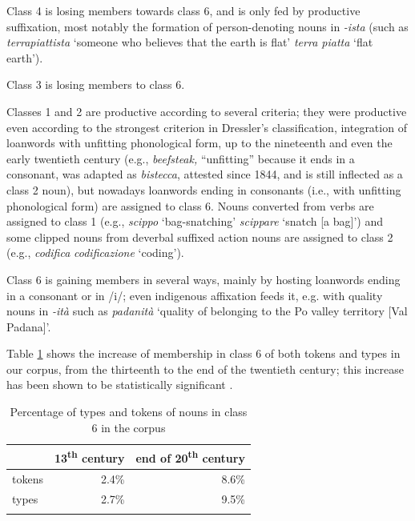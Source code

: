 \documentclass[output=paper,colorlinks,citecolor=brown]{langscibook}
\begin{document}
Class 4 is losing members towards class 6, and is only fed by productive suffixation, most notably the formation of person-denoting nouns in \emph{-ista} (such as \emph{terrapiattista} `someone who believes that the earth is flat' \leftarrow \emph{terra piatta} `flat earth').

Class 3 is losing members to class 6.

Classes 1 and 2 are productive according to several criteria; they were productive even according to the strongest criterion in Dressler's classification, integration of loanwords with unfitting phonological form, up to the nineteenth and even the early twentieth century (e.g.,  \emph{beefsteak,} ``unfitting'' because it ends in a consonant, was adapted as \emph{bistecca}, attested since 1844, and is still
inflected as a class 2 noun), but nowadays loanwords ending in consonants (i.e., with unfitting phonological form) are assigned to class 6. Nouns converted from verbs are assigned to class 1 (e.g., \emph{scippo} `bag-snatching' \leftarrow \emph{scippare} `snatch [a bag]') and some clipped nouns from deverbal suffixed action nouns are assigned to class 2 (e.g., \emph{codifica} \leftarrow \emph{codificazione} `coding').

Class 6 is gaining members in several ways, mainly by hosting loanwords ending in a consonant or in /i/; even indigenous affixation feeds it, e.g. with quality nouns in \emph{-ità} such as \emph{padanità} `quality of belonging to the Po valley territory [Val Padana]'.

Table \ref{10tab8} shows the increase of membership in class 6 of both tokens and types in our corpus, from the thirteenth to the end of the twentieth century; this increase has been shown to be statistically significant \citep[219]{dachillethornton2003}.

\begin{table}[ht]
	\centering
	\begin{tabularx}{0.6\textwidth}{lrr}
		\lsptoprule
		& 13\textsuperscript{th} century & end of 20\textsuperscript{th} century \\
		\midrule
		tokens & 2.4\% & 8.6\% \\
		types &  2.7\% & 9.5\% \\
		\lspbottomrule
	\end{tabularx}
	\caption{Percentage of types and tokens of nouns in class 6 in the corpus}
	\label{10tab8}
\end{table}
\end{document}
